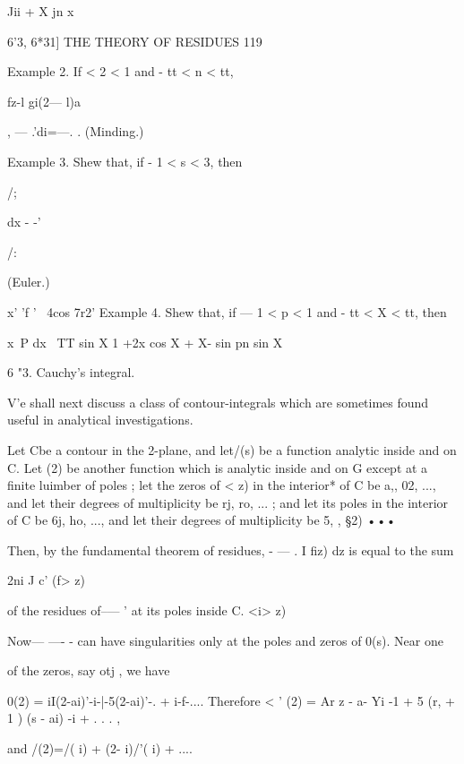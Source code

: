 Jii + X jn x



6'3, 6*31] THE THEORY OF RESIDUES 119

Example 2. If < 2 < 1 and - tt < n < tt,



  



fz-l gi(2— l)a

, — .'di=—. . (Minding.)



Example 3. Shew that, if - 1 < s < 3, then



/;



  dx - -'



/:



(Euler.)



   x' 'f ' ~4cos 7r2' Example 4. Shew that, if — 1 < p < 1 and - tt <
X < tt, then

x~P dx \ TT sin X 1 +2x cos X + X- sin pn sin X

6 "3. Cauchy's integral.

 V'e shall next discuss a class of contour-integrals which are
sometimes found useful in analytical investigations.

Let Cbe a contour in the 2-plane, and let/(s) be a function analytic
inside and on C. Let (2) be another function which is analytic inside
and on G except at a finite luimber of poles ; let the zeros of < z)
in the interior* of C be a,, 02, ..., and let their degrees of
multiplicity be rj, ro, ... ; and let its poles in the interior of C
be 6j, ho, ..., and let their degrees of multiplicity be 5, , §2) •••

Then, by the fundamental theorem of residues, - — . I fiz) dz is equal
to the sum

 2ni J c' (f> z)

of the residues of--— ' at its poles inside C. <i> z)

Now— —- - can have singularities only at the poles and zeros of 0(s).
Near one

of the zeros, say otj , we have

0(2) = iI(2-ai)'-i-|-5(2-ai)'-. + i-f-.... Therefore < ' (2) = Ar z -
a- Yi -1 + 5 (r, + 1 ) (s - ai) -i + . . . ,

and /(2)=/( i) + (2- i)/'( i) + ....

